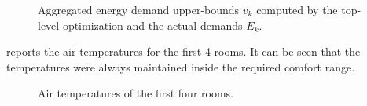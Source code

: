 \begin{figure}[tb]
  \centering
  
  \caption{Aggregated energy demand upper-bounds $v_{k}$ computed by the top-level optimization and the actual demands $E_{k}$.}
  \label{fig:simulation:demand}
\end{figure}


 reports the air temperatures for the first 4 rooms.
It can be seen that the temperatures were always maintained inside the required comfort range.

\begin{figure}[tb]
  \centering
  
  \caption{Air temperatures of the first four rooms.}
  \label{fig:simulation:temp}
\end{figure}



